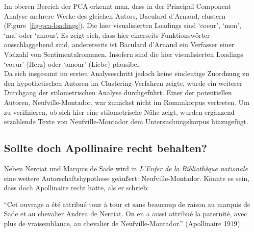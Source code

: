 \documentclass[
  12pt,
  letterpaper,
  DIV=11,
  numbers=noendperiod]{scrreprt}
\begin{document}
Im oberen Bereich der PCA erkennt man, dass in der Principal Component
Analyse mehrere Werke des gleichen Autors, Baculard d'Arnaud, clustern
(Figure~\ref{fig-pca-loadings}). Die hier visualisierten Loadings sind
`coeur', `mon', `ma' oder `amour'. Es zeigt sich, dass hier einerseits
Funktionswörter ausschlaggebend sind, andererseits ist Baculard d'Arnaud
ein Verfasser einer Vielzahl von Sentimentalromanen. Insofern sind die
hier visualisierten Loadings `coeur' (Herz) oder `amour' (Liebe)
plausibel.\\
Da sich insgesamt im ersten Analyseschritt jedoch keine eindeutige
Zuordnung zu den hypothetischen Autoren im Clustering-Verfahren zeigte,
wurde ein weiterer Durchgang der stilometrischen Analyse durchgeführt.
Einer der potentiellen Autoren, Neufville-Montador, war zunächst nicht
im Romankorpus vertreten. Um zu verifizieren, ob sich hier eine
stilometrische Nähe zeigt, wurden ergänzend erzählende Texte von
Neufville-Montador dem Untersuchungskorpus hinzugefügt.

\subsection{Sollte doch Apollinaire recht
behalten?}\label{sollte-doch-apollinaire-recht-behalten}

Neben Nerciat und Marquis de Sade wird in \emph{L'Enfer de la
Bibliothèque nationale} eine weitere Autorschaftshypothese geäußert:
Neufville-Montador. Könnte es sein, dass doch Apollinaire recht hatte,
als er schrieb:

``Cet ouvrage a été attribué tour à tour et sans beaucoup de raison au
marquis de Sade et au chevalier Andrea de Nerciat. On en a aussi
attribué la paternité, avec plus de vraisemblance, au chevalier de
Neufville-Montador.'' (Apollinaire 1919)
\end{document}
